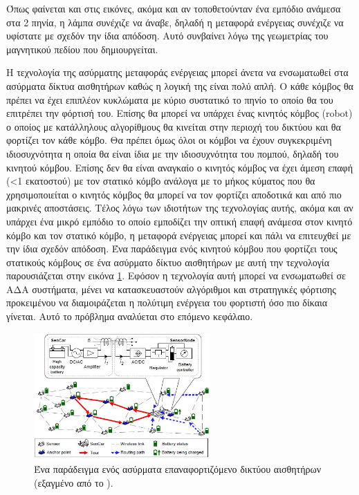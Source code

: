 Όπως φαίνεται και στις εικόνες, ακόμα και αν τοποθετούνταν ένα εμπόδιο ανάμεσα στα 2 πηνία, η λάμπα συνέχιζε να άναβε, δηλαδή η μεταφορά ενέργειας συνέχιζε να
υφίστατε με σχεδόν την ίδια απόδοση. Αυτό συνβαίνει λόγω της γεωμετρίας του μαγνητικού πεδίου που δημιουργείται.

Η τεχνολογία της ασύρματης μεταφοράς ενέργειας μπορεί άνετα να ενσωματωθεί στα ασύρματα δίκτυα αισθητήρων καθώς η λογική της είναι πολύ απλή. Ο κάθε κόμβος θα πρέπει
να έχει επιπλέον κυκλώματα με κύριο συστατικό το πηνίο το οποίο θα του επιτρέπει την φόρτισή του. Επίσης θα μπορεί να υπάρχει ένας κινητός κόμβος (robot) ο οποίος με
κατάλληλους αλγορίθμους θα κινείται στην περιοχή του δικτύου και θα φορτίζει τον κάθε κόμβο. Θα πρέπει όμως όλοι οι κόμβοι να έχουν συγκεκριμένη ιδιοσυχνότητα η
οποία θα είναι ίδια με την ιδιοσυχνότητα του πομπού, δηλαδή του κινητού κόμβου. Επίσης δεν θα είναι αναγκαίο ο κινητός κόμβος να έχει άμεση επαφή (<1 εκατοστού) με
τον στατικό κόμβο ανάλογα με το μήκος κύματος που θα χρησιμοποιείται ο κινητός κόμβος θα μπορεί να τον φορτίζει αποδοτικά και από πιο μακρινές αποστάσεις. Τέλος λόγω
των ιδιοτήτων της τεχνολογίας αυτής, ακόμα και αν υπάρχει ένα μικρό εμπόδιο το οποίο εμποδίζει την οπτική επαφή ανάμεσα στον κινητό κόμβο και τον στατικό κόμβο, η
μεταφορά ενέργειας μπορεί και πάλι να επιτευχθεί με την ίδια σχεδόν απόδοση. Ένα παράδειγμα ενός κινητού κόμβου που φορτίζει τους στατικούς κόμβους σε ένα ασύρματο
δίκτυο αισθητήρων με αυτή την τεχνολογία παρουσιάζεται στην εικόνα \ref{fig:wrsn_example}. Εφόσον η τεχνολογία αυτή μπορεί να ενσωματωθεί σε ΑΔΑ συστήματα, μένει να
κατασκευαστούν αλγόριθμοι και στρατηγικές φόρτισης προκειμένου να διαμοιράζεται η πολύτιμη ενέργεια του φορτιστή όσο πιο δίκαια γίνεται. Αυτό το πρόβλημα αναλύεται
στο επόμενο κεφάλαιο.


\begin{figure}[h]
	\centering
	\includegraphics[width=0.6\textwidth]{images/sencar_example.jpg}
	\caption{Ένα παράδειγμα ενός ασύρματα επαναφορτιζόμενο δικτύου αισθητήρων (εξαγμένο από το \cite{yuanyuan_joint}).}
	\label{fig:wrsn_example}
\end{figure}
